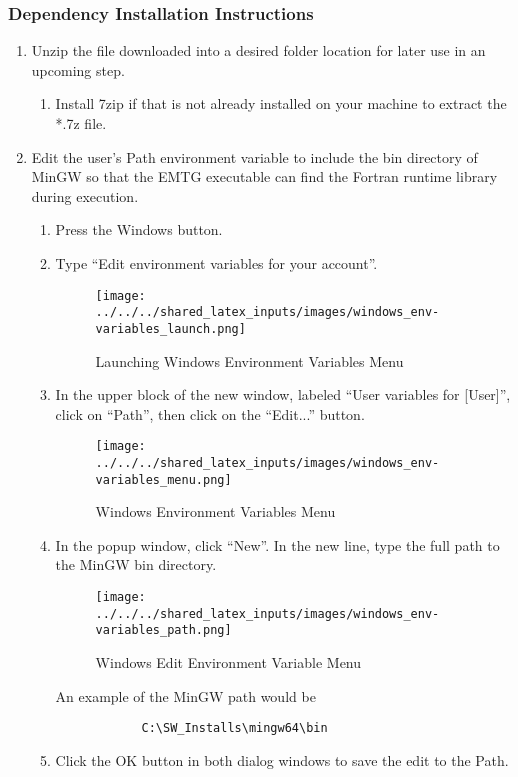 \subsubsection{Dependency Installation Instructions}
\label{sec:mingw_installation_instructions}
\begin{enumerate}
	\item Unzip the file downloaded into a desired folder location for later use in an upcoming step. 
	\begin{enumerate}
		\item Install 7zip if that is not already installed on your machine to extract the *.7z file. 
	\end{enumerate}	
	\item \label{bundle:mingw} Edit the user’s Path environment variable to include the bin directory of MinGW so that the EMTG executable can find the Fortran runtime library during execution.
	\begin{enumerate}
		\item Press the Windows button.
		\item Type “Edit environment variables for your account”. %
		\begin{figure}[H]
			\centering
			\texttt{[image: ../../../shared\_latex\_inputs/images/windows\_env-variables\_launch.png]}
			\caption{Launching Windows Environment Variables Menu}
		\end{figure}
		\item In the upper block of the new window, labeled “User variables for [User]”, click on “Path”, then click on the “Edit...” button. 
		\begin{figure}[H]
			\centering
			\texttt{[image: ../../../shared\_latex\_inputs/images/windows\_env-variables\_menu.png]}
			\caption{Windows Environment Variables Menu}
		\end{figure}
		\item In the popup window, click “New”. In the new line, type the full path to the MinGW bin directory. 
		\begin{figure}[H]
			\centering
			\texttt{[image: ../../../shared\_latex\_inputs/images/windows\_env-variables\_path.png]}
			\caption{Windows Edit Environment Variable Menu}
		\end{figure}
		An example of the MinGW path would be 
		\begin{verbatim}
			C:\SW_Installs\mingw64\bin
		\end{verbatim}
		\item Click the OK button in both dialog windows to save the edit to the Path.
	\end{enumerate}		
\end{enumerate}

